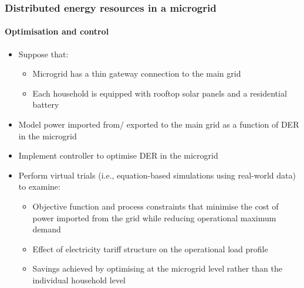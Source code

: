 \documentclass[handout, smaller, xcolor=table]{beamer}			%
\begin{document}
\begin{frame}
	\frametitle{Distributed energy resources in a microgrid}
	\framesubtitle{Optimisation and control}

	\begin{itemize}
		\item  Suppose that:
		\begin{itemize}
			\item  Microgrid has a thin gateway connection to the main grid
			\item  Each household is equipped with rooftop solar panels and a residential battery
		\end{itemize}
		
		\item  Model power imported from/ exported to the main grid as a function of DER in the microgrid
		
		\item  Implement controller to optimise DER in the microgrid
		
		\item  Perform virtual trials (i.e., equation-based simulations using real-world data) to examine:
		\begin{itemize}
			\item  Objective function and process constraints that minimise the cost of power imported from the grid while reducing operational maximum demand
			\item  Effect of electricity tariff structure on the operational load profile
			\item  Savings achieved by optimising at the microgrid level rather than the individual household level
		\end{itemize}
	
	\end{itemize}

\end{frame}
\end{document}
